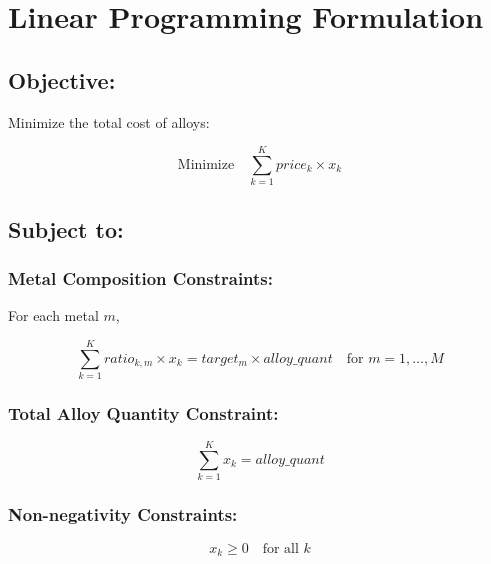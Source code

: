 \documentclass{article}
\begin{document}
\section*{Linear Programming Formulation}

\subsection*{Objective:}
Minimize the total cost of alloys:

\begin{equation}
\text{Minimize} \quad \sum_{k=1}^{K} price_k \times x_k
\end{equation}

\subsection*{Subject to:}

\subsubsection*{Metal Composition Constraints:}
For each metal \( m \),

\begin{equation}
\sum_{k=1}^{K} ratio_{k, m} \times x_k = target_m \times alloy\_quant \quad \text{for } m = 1, \ldots, M
\end{equation}

\subsubsection*{Total Alloy Quantity Constraint:}
\begin{equation}
\sum_{k=1}^{K} x_k = alloy\_quant
\end{equation}

\subsubsection*{Non-negativity Constraints:}
\begin{equation}
x_k \geq 0 \quad \text{for all } k
\end{equation}
\end{document}
